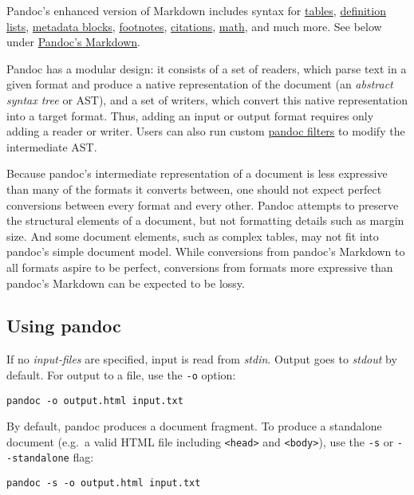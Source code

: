 \documentclass[
  12pt,
  a4paper,
]{article}
\begin{document}
Pandoc's enhanced version of Markdown includes syntax for \protect\hyperlink{tables}{tables},
\protect\hyperlink{definition-lists}{definition lists},
\protect\hyperlink{metadata-blocks}{metadata blocks}, \protect\hyperlink{footnotes}{footnotes},
\protect\hyperlink{citations}{citations}, \protect\hyperlink{math}{math}, and much more. See below
under \protect\hyperlink{pandocs-markdown}{Pandoc's Markdown}.

Pandoc has a modular design: it consists of a set of readers, which parse text in a given format
and produce a native representation of the document (an \emph{abstract syntax tree} or AST), and a
set of writers, which convert this native representation into a target format. Thus, adding an
input or output format requires only adding a reader or writer. Users can also run custom
\href{http://pandoc.org/filters.html}{pandoc filters} to modify the intermediate AST.

Because pandoc's intermediate representation of a document is less expressive than many of the
formats it converts between, one should not expect perfect conversions between every format and
every other. Pandoc attempts to preserve the structural elements of a document, but not formatting
details such as margin size. And some document elements, such as complex tables, may not fit into
pandoc's simple document model. While conversions from pandoc's Markdown to all formats aspire to
be perfect, conversions from formats more expressive than pandoc's Markdown can be expected to be
lossy.

\hypertarget{using-pandoc}{%
\subsection{Using pandoc}\label{using-pandoc}}

If no \emph{input-files} are specified, input is read from \emph{stdin}. Output goes to
\emph{stdout} by default. For output to a file, use the \texttt{-o} option:

\begin{verbatim}
pandoc -o output.html input.txt
\end{verbatim}

By default, pandoc produces a document fragment. To produce a standalone document (e.g.~a valid
HTML file including \texttt{\textless{}head\textgreater{}} and
\texttt{\textless{}body\textgreater{}}), use the \texttt{-s} or \texttt{-\/-standalone} flag:

\begin{verbatim}
pandoc -s -o output.html input.txt
\end{verbatim}
\end{document}
